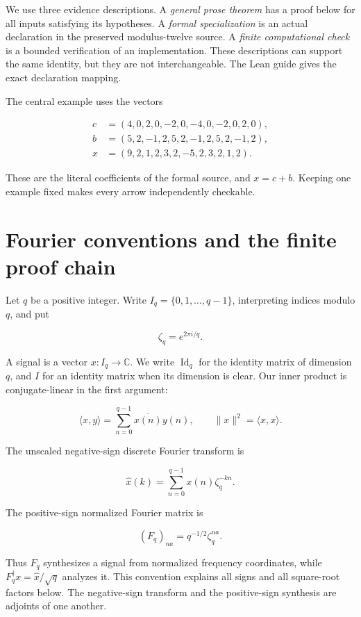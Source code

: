 We use three evidence descriptions. A \emph{general prose theorem} has a
proof below for all inputs satisfying its hypotheses. A \emph{formal
specialization} is an actual declaration in the preserved modulus-twelve
source. A \emph{finite computational check} is a bounded verification of
an implementation. These descriptions can support the same identity, but
they are not interchangeable. The Lean guide gives the exact declaration
mapping.

The central example uses the vectors

\[
\begin{aligned}
c&=(4,0,2,0,-2,0,-4,0,-2,0,2,0),\\
b&=(5,2,-1,2,5,2,-1,2,5,2,-1,2),\\
x&=(9,2,1,2,3,2,-5,2,3,2,1,2).
\end{aligned}
\]

These are the literal coefficients of the formal source, and \(x=c+b\).
Keeping one example fixed makes every arrow independently checkable.

\hypertarget{q:fourier-conventions-and-the-finite-proof-chain}{%
\section{Fourier conventions and the finite proof
chain}\label{q:fourier-conventions-and-the-finite-proof-chain}}

Let \(q\) be a positive integer. Write \(I_q=\{0,1,\ldots,q-1\}\),
interpreting indices modulo \(q\), and put

\[
\zeta_q=e^{2\pi i/q}.
\]

A signal is a vector \(x:I_q\to\mathbb C\). We write \(\operatorname{Id}_q\) for the identity matrix of dimension \(q\), and \(I\) for an identity matrix when its dimension is clear. Our inner product is
conjugate-linear in the first argument:

\[
\langle x,y\rangle=\sum_{n=0}^{q-1}\overline{x(n)}y(n),
\qquad \|x\|^2=\langle x,x\rangle.
\]

The unscaled negative-sign discrete Fourier transform is

\[
\widehat{x}(k)=\sum_{n=0}^{q-1}x(n)\zeta_q^{-kn}.
\]

The positive-sign normalized Fourier matrix is

\[
(F_q)_{na}=q^{-1/2}\zeta_q^{na}.
\]

Thus \(F_q\) synthesizes a signal from normalized frequency coordinates,
while \(F_q^\dagger x=\widehat{x}/\sqrt q\) analyzes it. This convention
explains all signs and all square-root factors below. The negative-sign
transform and the positive-sign synthesis are adjoints of one another.

